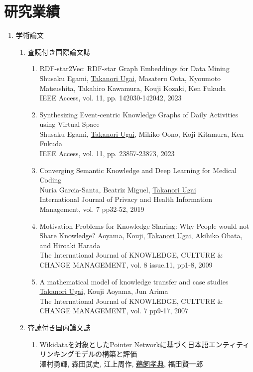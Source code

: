 \documentclass[dvipdfmx]{jlreq}
\begin{document}
\newpage
\section{研究業績}
\begin{enumerate}
\item 学術論文
\begin{enumerate}
\item 査読付き国際論文誌
\begin{enumerate}
\item RDF-star2Vec: RDF-star Graph Embeddings for Data Mining\\
Shusaku Egami, \underline{Takanori Ugai}, Masateru Oota, Kyoumoto Matsushita, Takahiro Kawamura, Kouji Kozaki, Ken Fukuda\\
IEEE Access, vol. 11, pp. 142030-142042, 2023
\item Synthesizing Event-centric Knowledge Graphs of Daily Activities using Virtual Space\\
Shusaku Egami, \underline{Takanori Ugai}, Mikiko Oono, Koji Kitamura, Ken Fukuda\\
IEEE Access, vol. 11, pp. 23857-23873, 2023
\item Converging Semantic Knowledge and Deep Learning for Medical Coding\\
Nuria Garcia-Santa, Beatriz Miguel,  \underline{Takanori Ugai}\\
International Journal of Privacy and Health Information Management, vol. 7 pp32-52, 2019
\item Motivation Problems for Knowledge Sharing: Why People would not Share Knowledge?
Aoyama, Kouji, \underline{Takanori Ugai}, Akihiko Obata, and Hiroaki Harada\\
The International Journal of KNOWLEDGE, CULTURE \& CHANGE MANAGEMENT, vol. 8 issue.11, pp1-8, 2009
\item A mathematical model of knowledge transfer and case studies\\
\underline{Takanori Ugai}, Kouji Aoyama, Jun Arima\\
The International Journal of KNOWLEDGE, CULTURE \& CHANGE MANAGEMENT, vol. 7 pp9-17, 2007
\end{enumerate}
\item 査読付き国内論文誌
\begin{enumerate}
\item Wikidataを対象としたPointer Networkに基づく日本語エンティティリンキングモデルの構築と評価\\
澤村勇輝, 森田武史, 江上周作, \underline{鵜飼孝典}, 福田賢一郎\\

\end{enumerate}
\end{enumerate}
\end{enumerate}
\end{document}
